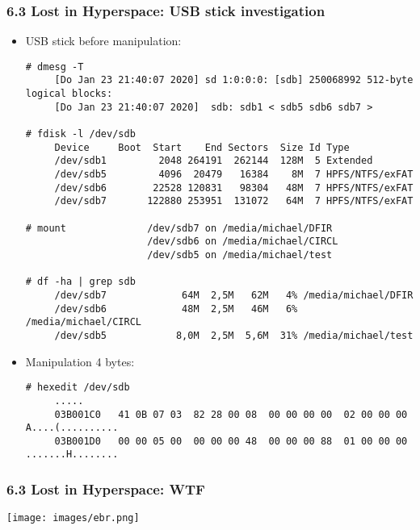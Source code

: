 \begin{frame}[fragile]
    \frametitle{6.3 Lost in Hyperspace: USB stick investigation}
    \begin{itemize}
            \item[] USB stick before manipulation:
\begin{lstlisting}[basicstyle=\tiny\ttfamily]
# dmesg -T
     [Do Jan 23 21:40:07 2020] sd 1:0:0:0: [sdb] 250068992 512-byte logical blocks: 
     [Do Jan 23 21:40:07 2020]  sdb: sdb1 < sdb5 sdb6 sdb7 >

# fdisk -l /dev/sdb
     Device     Boot  Start    End Sectors  Size Id Type
     /dev/sdb1         2048 264191  262144  128M  5 Extended
     /dev/sdb5         4096  20479   16384    8M  7 HPFS/NTFS/exFAT
     /dev/sdb6        22528 120831   98304   48M  7 HPFS/NTFS/exFAT
     /dev/sdb7       122880 253951  131072   64M  7 HPFS/NTFS/exFAT

# mount              /dev/sdb7 on /media/michael/DFIR
                     /dev/sdb6 on /media/michael/CIRCL
                     /dev/sdb5 on /media/michael/test

# df -ha | grep sdb
     /dev/sdb7             64M  2,5M   62M   4% /media/michael/DFIR
     /dev/sdb6             48M  2,5M   46M   6% /media/michael/CIRCL
     /dev/sdb5            8,0M  2,5M  5,6M  31% /media/michael/test
\end{lstlisting}
            \item[] Manipulation 4 bytes:
\begin{lstlisting}[basicstyle=\tiny\ttfamily]
# hexedit /dev/sdb
     .....
     03B001C0   41 0B 07 03  82 28 00 08  00 00 00 00  02 00 00 00  A....(..........
     03B001D0   00 00 05 00  00 00 00 48  00 00 00 88  01 00 00 00  .......H........
\end{lstlisting}
    \end{itemize}
\end{frame}


\begin{frame}[fragile]
    \frametitle{6.3 Lost in Hyperspace: WTF}
    \texttt{[image: images/ebr.png]}
\end{frame}


